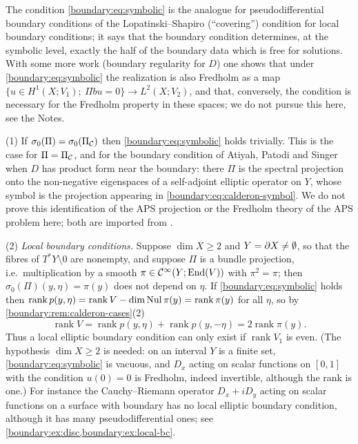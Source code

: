 The condition \eqref{boundary:eq:symbolic} is the analogue for pseudodifferential
boundary conditions of the Lopatinski--Shapiro (``covering'') condition for local
boundary conditions; it says that the boundary condition determines, at the symbolic
level, exactly the half of the boundary data which is free for solutions. With some more
work (boundary regularity for $D$) one shows that under \eqref{boundary:eq:symbolic} the
realization is also Fredholm as a map $\{u\in H^1(X;V_1);\ \Pi bu=0\}\to L^2(X;V_2)$, and
that, conversely, the condition is necessary for the Fredholm property in these spaces; we
do not pursue this here, see the Notes.

\begin{remark}\label{boundary:rem:bc-examples}
(1) If $\sigma_0(\Pi)=\sigma_0(\Pi_{\mathcal{C}})$ then \eqref{boundary:eq:symbolic} holds trivially.
This is the case for $\Pi=\Pi_{\mathcal{C}}$, and for the boundary condition of Atiyah, Patodi and
Singer when $D$ has product form near the boundary: there $\Pi$ is the spectral projection
onto the non-negative eigenspaces of a self-adjoint elliptic operator on $Y$, whose
symbol is the projection appearing in \eqref{boundary:eq:calderon-symbol}. We do not
prove this identification of the APS projection or the Fredholm theory of the APS
problem here; both are imported from \cite{Melrose-APS}.

(2) \emph{Local boundary conditions.} Suppose $\dim X\ge2$ and $Y=\partial X\ne\emptyset$,
so that the fibres of $T^*Y\setminus0$ are nonempty, and suppose $\Pi$ is a bundle
projection, i.e.\
multiplication by a smooth $\pi\in\mathcal{C}^\infty(Y;\operatorname{End}(V))$ with $\pi^2=\pi$; then $\sigma_0(\Pi)
(y,\eta)=\pi(y)$ does not depend on $\eta$. If \eqref{boundary:eq:symbolic} holds then
$\operatorname{rank}p(y,\eta)=\operatorname{rank}V-\dim\operatorname{Nul}\pi(y)=\operatorname{rank}\pi(y)$
for all $\eta$, so by \cref{boundary:rem:calderon-cases}(2)
\begin{equation*}
\operatorname{rank}V=\operatorname{rank}p(y,\eta)+\operatorname{rank}p(y,-\eta)=
2\operatorname{rank}\pi(y).
\end{equation*}
Thus a local elliptic boundary condition can only exist if $\operatorname{rank}V_1$ is
even. (The hypothesis $\dim X\ge2$ is needed: on an interval $Y$ is a finite set,
\eqref{boundary:eq:symbolic} is vacuous, and $D_x$ acting on scalar functions on $[0,1]$
with the condition $u(0)=0$ is Fredholm, indeed invertible, although the rank is one.) For instance the Cauchy--Riemann operator $D_x+iD_y$ acting on scalar functions on
a surface with boundary has no local elliptic boundary condition, although it has many
pseudodifferential ones; see \cref{boundary:ex:disc,boundary:ex:local-bc}.
\end{remark}

